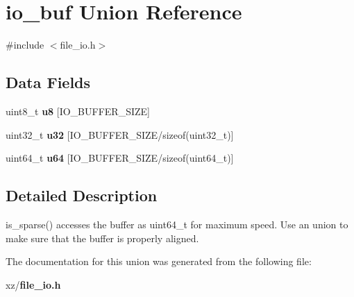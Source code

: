 \section{io\-\_\-buf Union Reference}
\label{unionio__buf}


{\ttfamily \#include $<$file\-\_\-io.\-h$>$}

\subsection*{Data Fields}
\begin{DoxyCompactItemize}
\item 
uint8\-\_\-t {\bfseries u8} [I\-O\-\_\-\-B\-U\-F\-F\-E\-R\-\_\-\-S\-I\-Z\-E]\label{unionio__buf_a8aeb5732cba5cae653b05fb6079850b7}

\item 
uint32\-\_\-t {\bfseries u32} [I\-O\-\_\-\-B\-U\-F\-F\-E\-R\-\_\-\-S\-I\-Z\-E/sizeof(uint32\-\_\-t)]\label{unionio__buf_a98e0cad575a6118c0518a823e8c0aa1e}

\item 
uint64\-\_\-t {\bfseries u64} [I\-O\-\_\-\-B\-U\-F\-F\-E\-R\-\_\-\-S\-I\-Z\-E/sizeof(uint64\-\_\-t)]\label{unionio__buf_a62b585619d3b3f93e24057fbe1658371}

\end{DoxyCompactItemize}


\subsection{Detailed Description}
is\-\_\-sparse() accesses the buffer as uint64\-\_\-t for maximum speed. Use an union to make sure that the buffer is properly aligned. 

The documentation for this union was generated from the following file\-:\begin{DoxyCompactItemize}
\item 
xz/{\bf file\-\_\-io.\-h}\end{DoxyCompactItemize}
